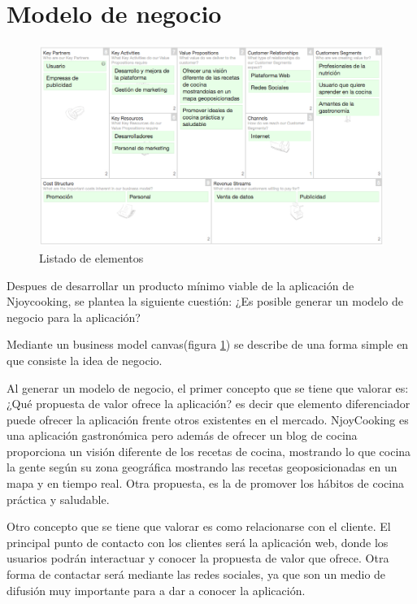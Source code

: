 \section{Modelo de negocio}

\begin{figure}
\begin{center}
\includegraphics[width=1.0\textwidth]{imagenes/business-canvas.png}
\caption{Listado de elementos}
\label{business-canvas}
\end{center}
\end{figure}

Despues de desarrollar un producto mínimo viable de la aplicación de Njoycooking, se plantea la siguiente cuestión: ¿Es posible generar un modelo de negocio para la aplicación?

Mediante un business model canvas(figura \ref{business-canvas}) se describe de una forma simple en que consiste la idea de negocio.

\vspace{5 mm}

Al generar un modelo de negocio, el primer concepto que se tiene que valorar es: ¿Qué propuesta de valor ofrece la aplicación? es decir que elemento diferenciador puede ofrecer la aplicación frente otros existentes en el mercado. NjoyCooking es una aplicación gastronómica pero además de ofrecer un blog de cocina proporciona un visión diferente de los recetas de cocina, mostrando lo que cocina la gente según su zona geográfica mostrando las recetas geoposicionadas en un mapa y en tiempo real. Otra propuesta, es la de promover los hábitos de cocina práctica y saludable.


\vspace{5 mm}

Otro concepto que se tiene que valorar es como relacionarse con el cliente. El principal punto de contacto con los clientes será la aplicación web, donde los usuarios podrán interactuar y conocer la propuesta de valor que ofrece. Otra forma de contactar será mediante las redes sociales, ya que son un medio de difusión muy importante para a dar a conocer la aplicación.

